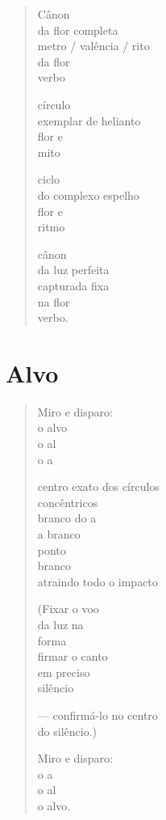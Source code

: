 \begin{verse}
Cânon\\
da flor completa\\
metro / valência / rito\\
da flor\\
verbo

círculo\\
exemplar de helianto\\
flor e\\
mito

ciclo\\
do complexo espelho\\
flor e\\
ritmo

cânon\\
da luz perfeita\\
capturada fixa\\
na flor\\
verbo.
\end{verse}

\chapter{Alvo}

\begin{verse}
Miro e disparo:\\
o alvo\\
o al\\
o a

centro exato dos círculos\\
concêntricos\\
branco do a\\
a branco\\
\quad{}ponto\\
\quad{}branco\\
atraindo todo o impacto

(Fixar o voo\\
da luz na\\
\quad\mbox{} forma\\
firmar o canto\\
em preciso\\
silêncio

--- confirmá-lo no centro\\
\qquad\qquad\quad{}do silêncio.)

Miro e disparo:\\
o a\\
o al\\
o alvo.
\end{verse}

